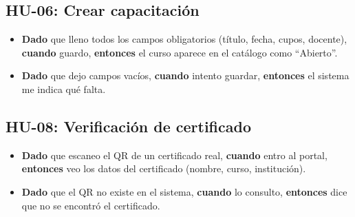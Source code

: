 \subsection{HU-06: Crear capacitación}
\begin{itemize}[nosep]
    \item \textbf{Dado} que lleno todos los campos obligatorios (título, fecha, cupos, docente), \textbf{cuando} guardo, \textbf{entonces} el curso aparece en el catálogo como ``Abierto''.
    \item \textbf{Dado} que dejo campos vacíos, \textbf{cuando} intento guardar, \textbf{entonces} el sistema me indica qué falta.
\end{itemize}

\subsection{HU-08: Verificación de certificado}
\begin{itemize}[nosep]
    \item \textbf{Dado} que escaneo el QR de un certificado real, \textbf{cuando} entro al portal, \textbf{entonces} veo los datos del certificado (nombre, curso, institución).
    \item \textbf{Dado} que el QR no existe en el sistema, \textbf{cuando} lo consulto, \textbf{entonces} dice que no se encontró el certificado.
\end{itemize}
